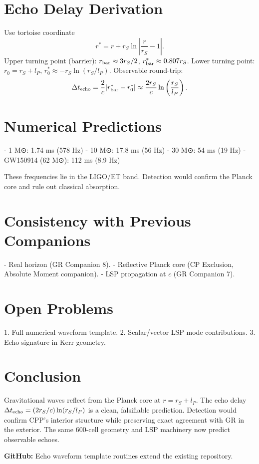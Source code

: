 \documentclass[12pt]{article}
\begin{document}
\section{Echo Delay Derivation}
Use tortoise coordinate
\[
r^* = r + r_S \ln\left|\frac{r}{r_S}-1\right|.
\]
Upper turning point (barrier): \(r_{\rm bar} \approx 3 r_S/2\), \(r^*_{\rm bar} \approx 0.807 r_S\).  
Lower turning point: \(r_0 = r_S + l_P\), \(r^*_0 \approx -r_S \ln(r_S/l_P)\).  
Observable round-trip:
\[
\Delta t_{\rm echo} = \frac{2}{c} |r^*_{\rm bar} - r^*_0| \approx \frac{2 r_S}{c} \ln\left(\frac{r_S}{l_P}\right).
\]

\section{Numerical Predictions}
- 1 M⊙: 1.74 ms (578 Hz)
- 10 M⊙: 17.8 ms (56 Hz)
- 30 M⊙: 54 ms (19 Hz)
- GW150914 (62 M⊙): 112 ms (8.9 Hz)

These frequencies lie in the LIGO/ET band. Detection would confirm the Planck core and rule out classical absorption.

\section{Consistency with Previous Companions}
- Real horizon (GR Companion 8).
- Reflective Planck core (CP Exclusion, Absolute Moment companion).
- LSP propagation at \(c\) (GR Companion 7).

\section{Open Problems}
1. Full numerical waveform template.
2. Scalar/vector LSP mode contributions.
3. Echo signature in Kerr geometry.

\section{Conclusion}
Gravitational waves reflect from the Planck core at \(r = r_S + l_P\). The echo delay \(\Delta t_{\rm echo} = (2 r_S / c) \ln(r_S / l_P)\) is a clean, falsifiable prediction. Detection would confirm CPP’s interior structure while preserving exact agreement with GR in the exterior. The same 600-cell geometry and LSP machinery now predict observable echoes.

\textbf{GitHub:} Echo waveform template routines extend the existing repository.
\end{document}
